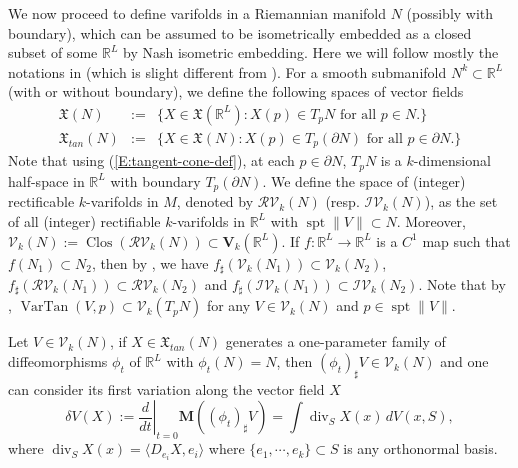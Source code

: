 \documentclass[10pt]{amsart}
\theoremstyle{definition}
\theoremstyle{remark}
\numberwithin{equation}{section}
\newcommand{\V}{\mathcal{V}}
\newcommand{\RV}{\mathcal{RV}}
\newcommand{\IV}{\mathcal{IV}}
\newcommand{\R}{\mathbb{R}}
\newcommand{\M}{\mathbf{M}}
\newcommand{\bV}{\mathbf{V}}
\newcommand{\bRV}{\mathbf{RV}}
\newcommand{\bIV}{\mathbf{IV}}
\newcommand{\VarTan}{\operatorname{VarTan}}
\newcommand{\spt}{\operatorname{spt}}
\newcommand{\Div}{\operatorname{div}}
\newcommand{\Clos}{\operatorname{Clos}}
\begin{document}
We now proceed to define varifolds in a Riemannian manifold $N$ (possibly with boundary), which can be assumed to be isometrically embedded as a closed subset of some $\R^L$ by Nash isometric embedding. Here we will follow mostly the notations in \cite{Pitts} (which is slight different from \cite{Allard72}). 
For a smooth submanifold $N^k \subset \mathbb{R}^L$ (with or without boundary), we define the following spaces of vector fields 
\begin{eqnarray}
\label{E:vector-fields}
\mathfrak{X}(N) &:=& \{X \in \mathfrak{X}(\mathbb{R}^L) : X(p) \in T_pN \text{ for all $p \in N$}.\} \\
\mathfrak{X}_{tan}(N) &:=& \{X \in \mathfrak{X}(N) : X(p) \in T_p(\partial N) \text{ for all $p \in \partial N$}. \} \nonumber
\end{eqnarray}
Note that using (\ref{E:tangent-cone-def}), at each $p \in \partial N$, $T_pN$ is a $k$-dimensional half-space in $\mathbb{R}^L$ with boundary $T_p(\partial N)$. 
We define the space of (integer) rectificable $k$-varifolds in $M$, denoted by $\RV_k(N)$ (resp. $\IV_k(N)$), as the set of all (integer) rectifiable $k$-varifolds in $\R^L$ with $\spt \|V\| \subset N$. Moreover, $\V_k(N):=\Clos (\RV_k(N)) \subset \bV_k(\mathbb{R}^L)$. 
If $f:\mathbb{R}^L \to \mathbb{R}^L$ is a $C^1$ map such that $f(N_1) \subset N_2$, then by \cite[2.1(18)(h)]{Pitts}, we have $f_\sharp(\V_k(N_1)) \subset \V_k(N_2)$, $f_\sharp(\RV_k(N_1)) \subset \RV_k(N_2)$ and $f_\sharp (\IV_k(N_1)) \subset \IV_k(N_2)$. Note that by \cite[2.1(18)(i)]{Pitts}, $\VarTan(V,p) \subset \V_k(T_pN)$ for any $V \in \V_k(N)$ and $p \in \spt \|V\|$.

Let $V \in \V_k(N)$, if $X \in \mathfrak{X}_{tan}(N)$ generates a one-parameter family of diffeomorphisms $\phi_t$ of $\mathbb{R}^L$ with $\phi_t(N)=N$, then $(\phi_t)_ \sharp V \in \V_k(N)$ and one can consider its first variation along the vector field $X$ \cite[39.2]{Simon}
\begin{equation}
\label{E:1st-variation}
\delta V (X) := \left. \frac{d}{dt}\right|_{t=0} \M((\phi_t)_\sharp V)=\int \Div_S X(x) \, dV(x, S), 
\end{equation}
where $\Div_S X(x)= \langle D_{e_i} X, e_i \rangle$ where $\{e_1,\cdots,e_k\} \subset S$ is any orthonormal basis.
\end{document}
